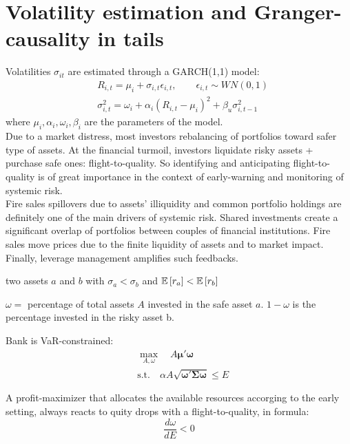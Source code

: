 \section{Volatility estimation and Granger-causality in tails}
Volatilities $\sigma_{it}$ are estimated through a GARCH(1,1) model:
\begin{align*}
	& R_{i,t} = \mu_i + \sigma_{i,t} \epsilon_{i,t}, \qquad \epsilon_{i,t} \sim WN(0,1)\\
	& \sigma^2_{i,t} = \omega_i + \alpha_i (R_{i,t} -\mu_i)^2 + \beta_u \sigma^2_{i,t-1}
\end{align*}
where $\mu_i, \alpha_i, \omega_i, \beta_i$ are the parameters of the model.\\
Due to a market distress, most investors rebalancing of portfolios toward safer type of assets. At the financial turmoil, investors liquidate risky assets + purchase safe ones: flight-to-quality. So identifying and anticipating flight-to-quality is of great importance in the context of early-warning and monitoring of systemic risk.\\
Fire sales spillovers due to assets’ illiquidity and common portfolio holdings are definitely one of the main drivers of systemic risk. Shared investments create a significant overlap of portfolios between couples of financial institutions. Fire sales move prices due to the finite liquidity of assets and to market impact.\\
Finally, leverage management amplifies such feedbacks.
\newpage
\begin{mysetting}
	\item two assets $a$ and $b$ with $\sigma_a<\sigma_b$ and $\mathbb{E}\left[r_a\right]<\mathbb{E}\left[r_b\right]$
	\item $\omega =$ percentage of total assets $A$ invested in the safe asset $a$. $1-\omega$ is the percentage invested in the risky asset b.
	\item Bank is VaR-constrained:
	\begin{align*}
		& \max_{A,\omega} \quad A\bm{\mu}'\bm{\omega}\\
	    & \text{s.t.} \quad \alpha A \sqrt{\bm{\omega}'\bm{\Sigma}\bm{\omega}} \leq E
	\end{align*}
\end{mysetting}
\begin{mytheorem}
	A profit-maximizer that allocates the available resources accorging to the early setting, always reacts to quity drops with a flight-to-quality, in formula:
	\[
	\frac{d \omega}{dE} <0
	\]
\end{mytheorem}
